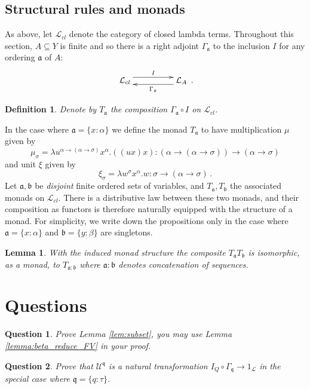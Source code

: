 \documentclass[english,letter paper,12pt,leqno]{article}
\def\be{\begin{equation}}
\def\ee{\end{equation}}
\def\typearrow{\Rightarrow}
\newtheorem{lemma}[theorem]{Lemma}
\newtheorem{question}{Question}
\theoremstyle{example}
\newtheorem{definition}[theorem]{Definition}
\numberwithin{equation}{section}
\newcommand{\call}[1]{\mathcal{#1}}
\def\be{\begin{equation}}
\def\ee{\end{equation}}
\def\typearrow{\rightarrow}
\begin{document}
\subsection{Structural rules and monads}\label{section:monads}
As above, let $\call{L}_{cl}$ denote the category of closed lambda terms. Throughout this section, $A \subseteq Y$ is finite and so there is a right adjoint $\Gamma_{\mathfrak{a}}$ to the inclusion $I$ for any ordering $\mathfrak{a}$ of $A$:
\be
\xymatrix@C+2pc{
	\call{L}_{cl} \ar@<1ex>[r]^-{I} & \call{L}_A \ar@<1ex>[l]^-{\Gamma_{\mathfrak{a}}}
}\,.
\ee
\begin{definition}\label{def:T_monad} Denote by $T_\mathfrak{a}$ the composition $\Gamma_\mathfrak{a} \circ I$ on $\call{L}_{cl}$.
\end{definition}
In the case where $\mathfrak{a} = \{x:\alpha\}$ we define the monad $T_\mathfrak{a}$ to have multiplication $\mu$ given by
$$\mu_{\sigma} = \lambda u^{\alpha \typearrow (\alpha \typearrow \sigma)}x^\alpha. ((ux)x) : (\alpha \typearrow (\alpha \typearrow \sigma)) \typearrow (\alpha \typearrow \sigma)$$
and unit $\xi$ given by
$$\xi_{\sigma} =  \lambda w^\sigma x^\alpha.w: \sigma \typearrow (\alpha \typearrow \sigma)\,.$$
Let $\mathfrak{a},\mathfrak{b}$ be \emph{disjoint} finite ordered sets of variables, and $T_\mathfrak{a}, T_\mathfrak{b}$ the associated monads on $\call{L}_{cl}$. There is a distributive law between these two monads, and their composition as functors is therefore naturally equipped with the structure of a monad. For simplicity, we write down the propositions only in the case where $\mathfrak{a} = \{ x : \alpha \}$ and $\mathfrak{b} = \{ y : \beta \}$ are singletons.
\begin{lemma}\label{lem:distlawlambda}
	With the induced monad structure the composite $T_\mathfrak{a} T_\mathfrak{b}$ is isomorphic, as a monad, to $T_{\mathfrak{a} : \mathfrak{b}}$ where $\mathfrak{a} : \mathfrak{b}$ denotes concatenation of sequences.
\end{lemma}

\section{Questions}
\begin{question}
	Prove Lemma \ref{lem:subset}, you may use Lemma \ref{lemma:beta_reduce_FV} in your proof.
\end{question}

\begin{question}
	Prove that $\mathscr{U}^\mathfrak{q}$ is a natural transformation $I_Q \circ \Gamma_\mathfrak{q} \longrightarrow 1_{\call{L}}$ in the special case where $\mathfrak{q} = \{ q: \tau \}$.
\end{question}
\end{document}
